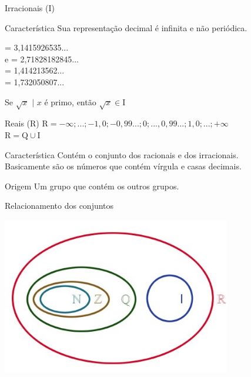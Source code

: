 \documentclass{beamer}
\begin{document}
    \begin{frame}{Irracionais ($\mathrm{I}$)}
        \begin{block}{Característica}
            Sua representação decimal é infinita e não periódica.
        \end{block}
        \begin{examples}
            \pi = 3,1415926535...\\
            e = 2,71828182845...\\
             = 1,414213562...\\
             = 1,732050807...\\
        \end{examples}
        \begin{alertblock}{}
            Se $\sqrt{x}$  $|$ $x$ é primo, então $\sqrt{x} \in \mathrm{I}$
        \end{alertblock}
    \end{frame}
    
    \begin{frame}{Reais ($\mathrm{R}$)}
        $\mathrm{R} = -\infty; ...; -1,0; -0,99...; 0; ..., 0,99...; 1,0; ...; +\infty$\\
        $\mathrm{R} = \mathrm{Q} \cup \mathrm{I}$
        \newline
        \begin{block}{Característica}
            Contém o conjunto dos racionais e dos irracionais.\\ Basicamente são os números que contém vírgula e casas decimais.
        \end{block}
        \begin{block}{Origem}
            Um grupo que contém os outros grupos.
        \end{block}
    \end{frame}
    
    \begin{frame}{Relacionamento dos conjuntos}
        \begin{center}
            \includegraphics[width=10cm]{imagens/relação.jpg}
        \end{center}
        \begin{center}
            
        \end{center}
    \end{frame}
    
\end{document}
